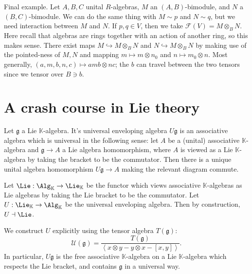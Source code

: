 Final example. Let $A,B,C$ unital $R$-algebras, $M$ an $(A,B)$-bimodule, and $N$ a $(B,C)$-bimodule. We can do the same thing with $M\sim p$ and $N \sim q$, but we need interaction between $M$ and $N$. If $p,q\in V$, then we take $\mathcal{F} (V)=M\otimes _BN$. Here recall that algebras are rings together with an action of another ring, so this makes sense. There exist maps $M\hookrightarrow M\otimes _BN$ and $N\hookrightarrow M\otimes _BN$ by making use of the pointed-ness of $M,N$ and mapping $m\mapsto m\otimes n_0$ and $n\mapsto m_0\otimes n$. Most generally, $(a,m,b,n,c)\mapsto amb\otimes nc$; the $b$ can travel between the two tensors since we tensor over $B\ni b$.

\section{A crash course in Lie theory}

\begin{definition}\label{3.2.1}
	Let $\mathfrak{g} $ a Lie $\mathbb{K} $-algebra. It's universal enveloping algebra $U\mathfrak{g} $ is an associative algebra which is universal in the following sense: let $A$ be a (unital) associative $\mathbb{K} $-algebra and $\mathfrak{g} \to A$ a Lie algebra homomorphism, where $A$ is viewed as a Lie $\mathbb{K} $-algebra by taking the bracket to be the commutator. Then there is a unique unital algebra homomorphism $U\mathfrak{g} \to A$ making the relevant diagram commute.
\end{definition}

\begin{remark}\label{3.2.2}
	Let $\Lie : \Alg_{\mathbb{K} }  \to \Lie _\mathbb{K} $ be the functor which views associative $\mathbb{K} $-algebras as Lie algebras by taking the Lie bracket to be the commutator. Let $U : \Lie _\mathbb{K}  \to \Alg_{\mathbb{K} } $ be the universal enveloping algebra. Then by construction, $U\dashv \Lie $.
\end{remark}

\begin{construction}\label{3.2.3}
We construct $U$ explicitly using the tensor algebra $T(\mathfrak{g} )$:
\[
	\mathcal{U} (\mathfrak{g}) = \frac{T(\mathfrak{g}) }{\left\langle x\otimes y - y\otimes x - [x,y] \right\rangle } 
.\]
In particular, $U\mathfrak{g} $ is the free associative $\mathbb{K} $-algebra on a Lie $\mathbb{K} $-algebra which respects the Lie bracket, and contains $\mathfrak{g} $ in a universal way.
\end{construction}

